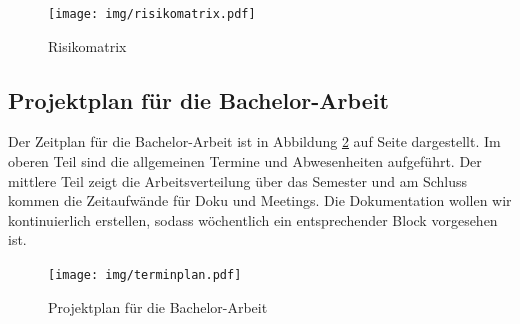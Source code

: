 \begin{figure}[h!]
	\centering
	\texttt{[image: img/risikomatrix.pdf]} 
	\caption{Risikomatrix}
	\label{img:risikomatrix}
\end{figure}




\subsection{Projektplan für die Bachelor-Arbeit}
Der Zeitplan für die Bachelor-Arbeit ist in Abbildung \ref{img:terminplan} auf Seite \pageref{img:terminplan} dargestellt.
Im oberen Teil sind die allgemeinen Termine und Abwesenheiten aufgeführt. Der mittlere Teil zeigt die Arbeitsverteilung über das Semester und am Schluss kommen die Zeitaufwände für Doku und Meetings. Die Dokumentation wollen wir kontinuierlich erstellen, sodass wöchentlich ein entsprechender Block vorgesehen ist.

\begin{figure}[h!]
\texttt{[image: img/terminplan.pdf]}
\caption{Projektplan für die Bachelor-Arbeit}
\label{img:terminplan}
\end{figure}



